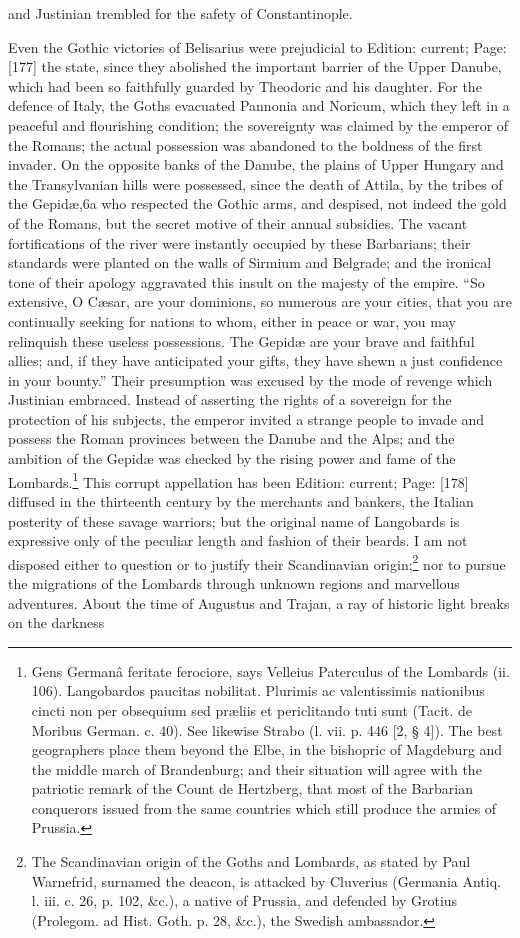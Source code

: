 and Justinian trembled for the safety of Constantinople.

Even the Gothic victories of Belisarius were prejudicial to Edition: current; Page: [177] the state, since they abolished the important barrier of the Upper Danube, which had been so faithfully guarded by Theodoric and his daughter. For the defence of Italy, the Goths evacuated Pannonia and Noricum, which they left in a peaceful and flourishing condition; the sovereignty was claimed by the emperor of the Romans; the actual possession was abandoned to the boldness of the first invader. On the opposite banks of the Danube, the plains of Upper Hungary and the Transylvanian hills were possessed, since the death of Attila, by the tribes of the Gepidæ,6a who respected the Gothic arms, and despised, not indeed the gold of the Romans, but the secret motive of their annual subsidies. The vacant fortifications of the river were instantly occupied by these Barbarians; their standards were planted on the walls of Sirmium and Belgrade; and the ironical tone of their apology aggravated this insult on the majesty of the empire. \texthebrew{“}So extensive, O Cæsar, are your dominions, so numerous are your cities, that you are continually seeking for nations to whom, either in peace or war, you may relinquish these useless possessions. The Gepidæ are your brave and faithful allies; and, if they have anticipated your gifts, they have shewn a just confidence in your bounty.\texthebrew{}” Their presumption was excused by the mode of revenge which Justinian embraced. Instead of asserting the rights of a sovereign for the protection of his subjects, the emperor invited a strange people to invade and possess the Roman provinces between the Danube and the Alps; and the ambition of the Gepidæ was checked by the rising power and fame of the Lombards.\footnote{Gens Germanâ feritate ferociore, says Velleius Paterculus of the Lombards (ii. 106). Langobardos paucitas nobilitat. Plurimis ac valentissimis nationibus cincti non per obsequium sed præliis et periclitando tuti sunt (Tacit. de Moribus German. c. 40). See likewise Strabo (l. vii. p. 446 [2, § 4]). The best geographers place them beyond the Elbe, in the bishopric of Magdeburg and the middle march of Brandenburg; and their situation will agree with the patriotic remark of the Count de Hertzberg, that most of the Barbarian conquerors issued from the same countries which still produce the armies of Prussia.} This corrupt appellation has been Edition: current; Page: [178] diffused in the thirteenth century by the merchants and bankers, the Italian posterity of these savage warriors; but the original name of Langobards is expressive only of the peculiar length and fashion of their beards. I am not disposed either to question or to justify their Scandinavian origin;\footnote{The Scandinavian origin of the Goths and Lombards, as stated by Paul Warnefrid, surnamed the deacon, is attacked by Cluverius (Germania Antiq. l. iii. c. 26, p. 102, \&c.), a native of Prussia, and defended by Grotius (Prolegom. ad Hist. Goth. p. 28, \&c.), the Swedish ambassador.} nor to pursue the migrations of the Lombards through unknown regions and marvellous adventures. About the time of Augustus and Trajan, a ray of historic light breaks on the darkness 